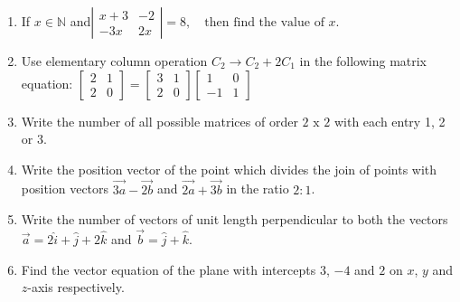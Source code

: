 \documentclass[a4paper,12pt]{article}
\begin{document}
\begin{enumerate}[label=\textbf{\arabic*.}]
	\item If $x \in \mathbb{N}$ and$ 
		\left|
		\begin{array}{cc}x + 3 & -2 \\-3x & 2x
		\end{array}
		\right| = 8, \quad \text{then find the value of } x.$
	\vspace{0.5em}
	\item Use elementary column operation $C_2		\rightarrow C_2 + 2C_1$ in the following matrix equation:
		$ 
		\begin{bmatrix}
			2 & 1 \\2 & 0 
		\end{bmatrix}
		=
		\begin{bmatrix}
			3 & 1 \\2 & 0
		\end{bmatrix}
		\begin{bmatrix}
			1 & 0 \\-1 & 1
		\end{bmatrix}$
	\vspace{0.5em}
	\item Write the number of all possible matrices of order $2 \text{ x } 2$ with each entry 1, 2 or 3.
	\vspace{0.5em}
	\item Write the position vector of the point which divides the join of points with position vectors $\vec{3a}- \vec{2b}$ and $\vec{2a} + \vec{3b}$ in the ratio $2 : 1$.
	\vspace{0.5em}
	\item Write the number of vectors of unit length perpendicular to both the vectors  $\vec{a} = 2\hat{i} + \hat{j} + 2\hat{k}$ and $\vec{b} = \hat{j} + \hat{k}$.
	\vspace{0.5em}
	\item Find the vector equation of the plane with intercepts $3$, $-4$ and $2$ on $x$, $y$ and $z$-axis respectively.
	\vspace{0.5em}
\newpage
\thispagestyle{plain}
\begin{center}

\end{center}
\end{enumerate}
\end{document}
